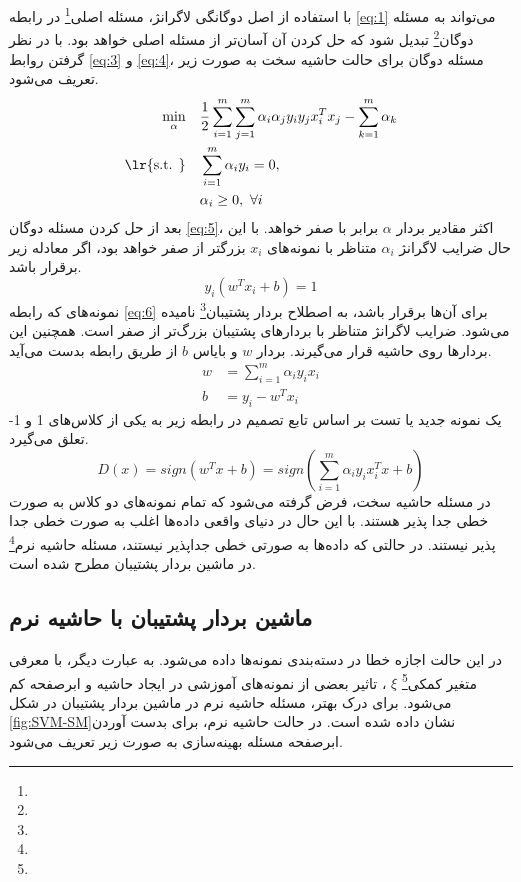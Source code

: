 با استفاده از اصل دوگانگی لاگرانژ، مسئله اصلی\footnote{}  در رابطه \ref{eq:1} می‌تواند به مسئله دوگان\footnote{}  تبدیل شود که حل کردن آن آسان‌تر از مسئله اصلی خواهد بود. با در نظر گرفتن روابط \ref{eq:3} و \ref{eq:4}، مسئله دوگان برای حالت حاشیه سخت به صورت زیر تعریف می‌شود.
\begin{equation}
\begin{split} 
\min\limits_{\alpha} \quad &\frac{1}{2}\sum\limits_{i=1}^{m}{\sum\limits_{j=1}^{m}{{{\alpha }_{i}}{{\alpha }_{j}}{{y}_{i}}{{y}_{j}}x_{i}^{T}{{x}_{j}}-\sum\limits_{k=1}^{m}{{{\alpha }_{k}}}}} \\
\textrm{\lr{s.t. }} \quad &\sum\limits_{i=1}^{m}{\alpha_{i}y_{i}}=0, \\
&\alpha_{i}\ge 0,\text{ }\forall i
\end{split}
\label{eq:5}
\end{equation}
بعد از حل کردن مسئله دوگان \ref{eq:5}، اکثر مقادیر بردار $\alpha$ برابر با صفر خواهد. با این حال ضرایب لاگرانژ  $\alpha_i$ متناظر با نمونه‌های $x_i$ بزرگتر از صفر خواهد بود، اگر معادله زیر برقرار باشد.
\begin{equation}
{{y}_{i}}({{w}^{T}}{{x}_{i}}+b)=1
\label{eq:6}
\end{equation}
\indent نمونه‌های  که رابطه \ref{eq:6} برای آن‌ها برقرار باشد، به اصطلاح بردار پشتیبان\footnote{}  نامیده می‌شود. ضرایب لاگرانژ متناظر با بردار‌های پشتیبان بزرگ‌تر از صفر است. همچنین این بردارها روی حاشیه قرار می‌گیرند. بردار $w$  و بایاس  $b$ از طریق رابطه  بدست می‌آید.
\begin{equation}
\begin{split}
w &= \sum\limits_{i=1}^{m}{\alpha_{i}y_{i}x_{i}} \\
b &= y_{i}-{w}^{T}{x}_{i}
\end{split}
\label{eq:7}
\end{equation}
یک نمونه جدید یا تست بر اساس تابع تصمیم در رابطه زیر به یکی از کلاس‌های 1 و 1- تعلق می‌گیرد.
\begin{equation}
D(x)=sign({{w}^{T}}x+b) = sign(\sum\limits_{i=1}^{m}{\alpha_{i}y_{i}x_{i}^{T}} x + b)
\label{eq:8}
\end{equation}
\indent در مسئله حاشیه سخت، فرض گرفته می‌شود که تمام نمونه‌های دو کلاس به صورت خطی جدا پذیر هستند. با این حال در دنیای واقعی داده‌ها اغلب به صورت خطی جدا پذیر نیستند. در حالتی که داده‌ها به صورتی خطی جداپذیر نیستند، مسئله حاشیه نرم\footnote{}  در ماشین بردار پشتیبان مطرح شده است.

\subsection{ماشین بردار پشتیبان با حاشیه نرم} \label{sec:2:1:2}
در این حالت اجازه خطا در دسته‌بندی نمونه‌ها داده می‌شود. به عبارت دیگر، با معرفی متغیر کمکی\footnote{} $\xi$ ، تاثیر بعضی از نمونه‌های آموزشی در ایجاد حاشیه و ابرصفحه کم می‌شود. برای درک بهتر، مسئله حاشیه نرم در ماشین بردار پشتیبان در شکل \ref{fig:SVM-SM}‏ نشان داده شده است. در حالت حاشیه نرم، برای بدست آوردن ابرصفحه مسئله بهینه‌سازی به صورت زیر تعریف می‌شود.

